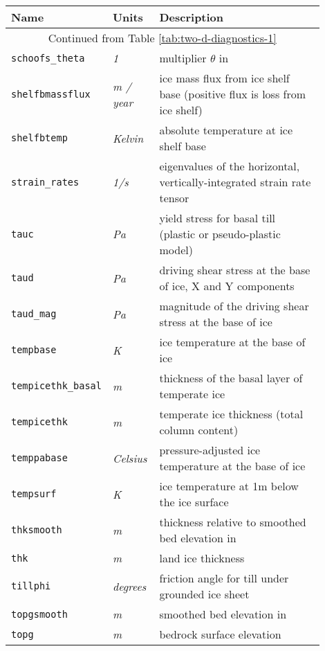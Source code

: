 \begin{table}[ht]
  \centering
  \begin{tabular}{p{0.15\linewidth}p{0.15\linewidth}p{0.6\linewidth}}
    \toprule
    \textbf{Name} & \textbf{Units} & \textbf{Description} \\
    \midrule
    \multicolumn{3}{c}{Continued from Table \ref{tab:two-d-diagnostics-1}}\\
    \texttt{schoofs_theta} & \textsl{1} &  multiplier $\theta$ in \cite{Schoofbasaltopg2003} \\
    \texttt{shelfbmassflux} & \textsl{m / year} & ice mass flux from ice shelf base (positive flux is loss from ice shelf) \\
    \texttt{shelfbtemp} & \textsl{Kelvin} & absolute temperature at ice shelf base \\
    \texttt{strain_rates} & \textsl{1/s} & eigenvalues of the horizontal, vertically-integrated strain rate tensor \\
    \texttt{tauc} & \textsl{Pa} & yield stress for basal till (plastic or pseudo-plastic model) \\
    \texttt{taud} & \textsl{Pa} & driving shear stress at the base of ice, X and Y components \\
    \texttt{taud_mag} & \textsl{Pa} &  magnitude of the driving shear stress at the base of ice \\
    \texttt{tempbase} & \textsl{K} &  ice temperature at the base of ice \\
    \texttt{tempicethk_basal} & \textsl{m} &  thickness of the basal layer of temperate ice \\
    \texttt{tempicethk} & \textsl{m} &  temperate ice thickness (total column content) \\
    \texttt{temppabase} & \textsl{Celsius} &  pressure-adjusted ice temperature at the base of ice \\
    \texttt{tempsurf} & \textsl{K} &  ice temperature at 1m below the ice surface \\
    \texttt{thksmooth} & \textsl{m} &  thickness relative to smoothed bed elevation in \cite{Schoofbasaltopg2003} \\
    \texttt{thk} & \textsl{m} & land ice thickness \\
    \texttt{tillphi} & \textsl{degrees} & friction angle for till under grounded ice sheet \\
    \texttt{topgsmooth} & \textsl{m} &  smoothed bed elevation in \cite{Schoofbasaltopg2003}\\
    \texttt{topg} & \textsl{m} & bedrock surface elevation \\

\end{tabular}
\end{table}
